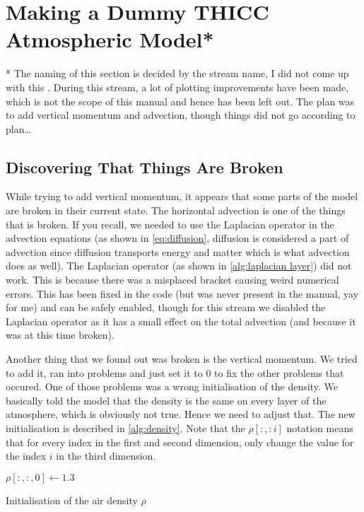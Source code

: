 \section{Making a Dummy THICC Atmospheric Model*}
* The naming of this section is decided by the stream name, I did not come up with this \cite{twitch}. During this stream, a lot of plotting improvements have been made, which is not the scope of
this manual and hence has been left out. The plan was to add vertical momentum and advection, though things did not go according to plan\dots

\subsection{Discovering That Things Are Broken}
While trying to add vertical momentum, it appears that some parts of the model are broken in their current state. The horizontal advection is one of the things that is broken. If you recall, 
we needed to use the Laplacian operator in the advection equations (as shown in \autoref{eq:diffusion}, diffusion is considered a part of advection since diffusion transports energy and matter
which is what advection does as well). The Laplacian operator (as shown in \autoref{alg:laplacian layer}) did not work. This is because there was a misplaced bracket causing weird numerical errors.
This has been fixed in the code (but was never present in the manual, yay for me) and can be safely enabled, though for this stream we disabled the Laplacian operator as it has a small effect on 
the total advection (and because it was at this time broken). %

Another thing that we found out was broken is the vertical momentum. We tried to add it, ran into problems and just set it to 0 to fix the other problems that occured. One of those problems was 
a wrong initialisation of the density. We basically told the model that the density is the same on every layer of the atmosphere, which is obviously not true. Hence we need to adjust that. The 
new initialisation is described in \autoref{alg:density}. Note that the $\rho[:,: i]$ notation means that for every index in the first and second dimension, only change the value for the index $i$
in the third dimension.

\begin{algorithm}
    $\rho[:, :, 0] \leftarrow 1.3$ \;
    \caption{Initialisation of the air density $\rho$}
    \label{alg:density}
\end{algorithm}